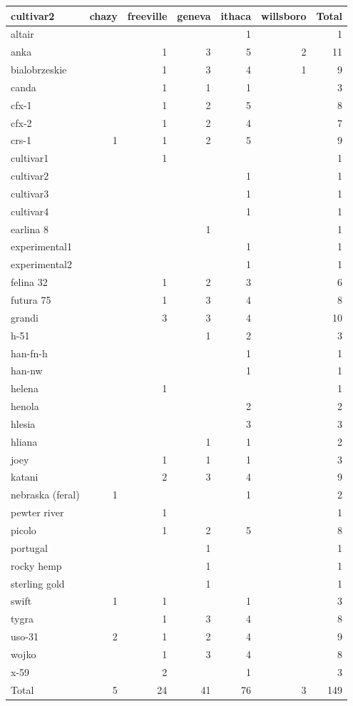 \documentclass[
]{agujournal2019}
\begin{document}
\begin{longtable}[]{@{}lrrrrrr@{}}
\toprule\noalign{}
cultivar2 & chazy & freeville & geneva & ithaca & willsboro & Total \\
\midrule\noalign{}
\endhead
\bottomrule\noalign{}
\endlastfoot
altair & & & & 1 & & 1 \\
anka & & 1 & 3 & 5 & 2 & 11 \\
bialobrzeskie & & 1 & 3 & 4 & 1 & 9 \\
canda & & 1 & 1 & 1 & & 3 \\
cfx-1 & & 1 & 2 & 5 & & 8 \\
cfx-2 & & 1 & 2 & 4 & & 7 \\
crs-1 & 1 & 1 & 2 & 5 & & 9 \\
cultivar1 & & 1 & & & & 1 \\
cultivar2 & & & & 1 & & 1 \\
cultivar3 & & & & 1 & & 1 \\
cultivar4 & & & & 1 & & 1 \\
earlina 8 & & & 1 & & & 1 \\
experimental1 & & & & 1 & & 1 \\
experimental2 & & & & 1 & & 1 \\
felina 32 & & 1 & 2 & 3 & & 6 \\
futura 75 & & 1 & 3 & 4 & & 8 \\
grandi & & 3 & 3 & 4 & & 10 \\
h-51 & & & 1 & 2 & & 3 \\
han-fn-h & & & & 1 & & 1 \\
han-nw & & & & 1 & & 1 \\
helena & & 1 & & & & 1 \\
henola & & & & 2 & & 2 \\
hlesia & & & & 3 & & 3 \\
hliana & & & 1 & 1 & & 2 \\
joey & & 1 & 1 & 1 & & 3 \\
katani & & 2 & 3 & 4 & & 9 \\
nebraska (feral) & 1 & & & 1 & & 2 \\
pewter river & & 1 & & & & 1 \\
picolo & & 1 & 2 & 5 & & 8 \\
portugal & & & 1 & & & 1 \\
rocky hemp & & & 1 & & & 1 \\
sterling gold & & & 1 & & & 1 \\
swift & 1 & 1 & & 1 & & 3 \\
tygra & & 1 & 3 & 4 & & 8 \\
uso-31 & 2 & 1 & 2 & 4 & & 9 \\
wojko & & 1 & 3 & 4 & & 8 \\
x-59 & & 2 & & 1 & & 3 \\
Total & 5 & 24 & 41 & 76 & 3 & 149 \\

\end{longtable}
\end{document}
